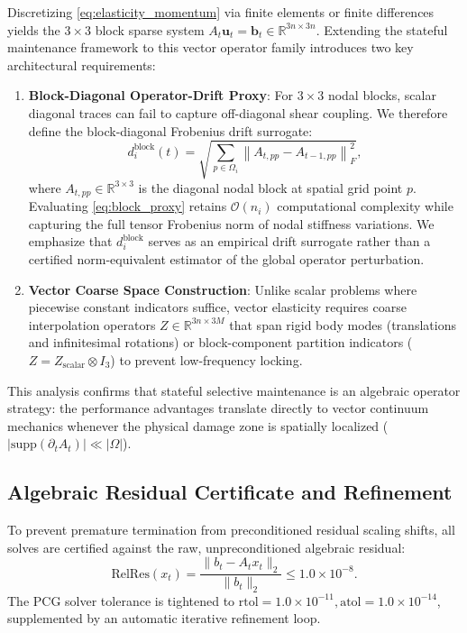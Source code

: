 \documentclass[preprint,12pt,3p]{elsarticle}
\begin{document}
Discretizing \eqref{eq:elasticity_momentum} via finite elements or finite differences yields the $3 \times 3$ block sparse system $A_t \boldsymbol{u}_t = \boldsymbol{b}_t \in \mathbb{R}^{3n \times 3n}$. Extending the stateful maintenance framework to this vector operator family introduces two key architectural requirements:
\begin{enumerate}
    \item \textbf{Block-Diagonal Operator-Drift Proxy}: For $3 \times 3$ nodal blocks, scalar diagonal traces can fail to capture off-diagonal shear coupling. We therefore define the block-diagonal Frobenius drift surrogate:
    \begin{equation}
    d_i^{\text{block}}(t) = \sqrt{\sum_{p \in \Omega_i} \left\| A_{t, pp} - A_{t-1, pp} \right\|_F^2},
    \label{eq:block_proxy}
    \end{equation}
    where $A_{t, pp} \in \mathbb{R}^{3 \times 3}$ is the diagonal nodal block at spatial grid point $p$. Evaluating \eqref{eq:block_proxy} retains $\mathcal{O}(n_i)$ computational complexity while capturing the full tensor Frobenius norm of nodal stiffness variations. We emphasize that $d_i^{\text{block}}$ serves as an empirical drift surrogate rather than a certified norm-equivalent estimator of the global operator perturbation.
    \item \textbf{Vector Coarse Space Construction}: Unlike scalar problems where piecewise constant indicators suffice, vector elasticity requires coarse interpolation operators $Z \in \mathbb{R}^{3n \times 3M}$ that span rigid body modes (translations and infinitesimal rotations) or block-component partition indicators ($Z = Z_{\text{scalar}} \otimes I_3$) to prevent low-frequency locking.
\end{enumerate}
This analysis confirms that stateful selective maintenance is an algebraic operator strategy: the performance advantages translate directly to vector continuum mechanics whenever the physical damage zone is spatially localized ($|\mathrm{supp}(\partial_t A_t)| \ll |\Omega|$).

\subsection{Algebraic Residual Certificate and Refinement}
To prevent premature termination from preconditioned residual scaling shifts, all solves are certified against the raw, unpreconditioned algebraic residual:
\begin{equation}
\text{RelRes}(x_t) = \frac{\|b_t - A_t x_t\|_2}{\|b_t\|_2} \le 1.0 \times 10^{-8}.
\label{eq:rel_res}
\end{equation}
The PCG solver tolerance is tightened to $\text{rtol} = 1.0 \times 10^{-11}, \text{atol} = 1.0 \times 10^{-14}$, supplemented by an automatic iterative refinement loop.
\end{document}
